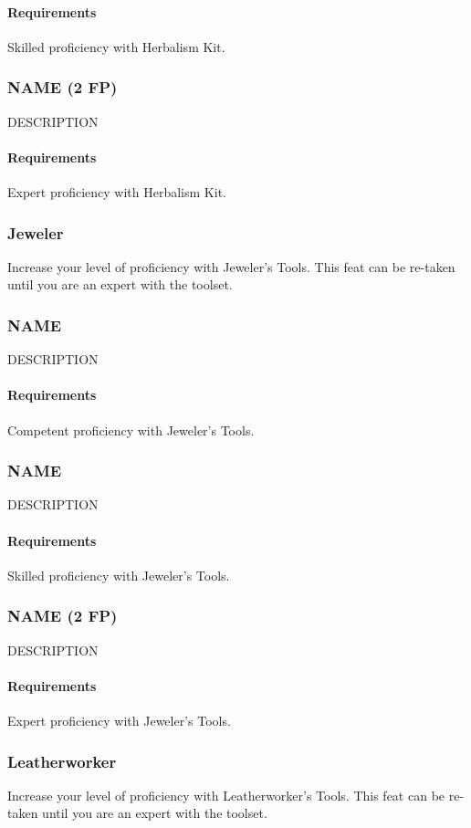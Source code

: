     \paragraph{Requirements} Skilled proficiency with Herbalism Kit.
\subsubsection{NAME (2 FP)} \label{feat::name}
    DESCRIPTION
    \paragraph{Requirements} Expert proficiency with Herbalism Kit.
\subsubsection{Jeweler} \label{feat::jeweler}
    Increase your level of proficiency with Jeweler's Tools.
    This feat can be re-taken until you are an expert with the toolset.
\subsubsection{NAME} \label{feat::name}
    DESCRIPTION
    \paragraph{Requirements} Competent proficiency with Jeweler's Tools.
\subsubsection{NAME} \label{feat::name}
    DESCRIPTION
    \paragraph{Requirements} Skilled proficiency with Jeweler's Tools.
\subsubsection{NAME (2 FP)} \label{feat::name}
    DESCRIPTION
    \paragraph{Requirements} Expert proficiency with Jeweler's Tools.
\subsubsection{Leatherworker} \label{feat::leatherworker}
    Increase your level of proficiency with Leatherworker's Tools.
    This feat can be re-taken until you are an expert with the toolset.
